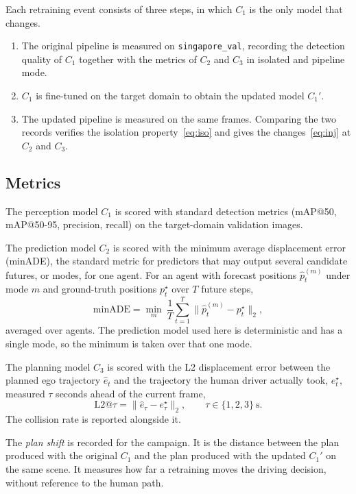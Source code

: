 \documentclass[conference]{IEEEtran}
\begin{document}
Each retraining event consists of three steps, in which $C_1$ is the only model
that changes.
\begin{enumerate}
\item The original pipeline is measured on \texttt{singapore\_val}, recording the
detection quality of $C_1$ together with the metrics of $C_2$ and $C_3$ in
isolated and pipeline mode.
\item $C_1$ is fine-tuned on the target domain to obtain the updated model
$C_1'$.
\item The updated pipeline is measured on the same frames. Comparing the two
records verifies the isolation property~\eqref{eq:iso} and gives the
changes~\eqref{eq:inj} at $C_2$ and $C_3$.
\end{enumerate}

\subsection{Metrics}
\label{sec:metrics}
The perception model $C_1$ is scored with standard detection metrics (mAP@50,
mAP@50-95, precision, recall) on the target-domain validation images.

The prediction model $C_2$ is scored with the minimum average displacement error
(minADE), the standard metric for predictors that may output several candidate
futures, or modes, for one agent. For an agent with forecast positions
$\hat{p}^{(m)}_{t}$ under mode $m$ and ground-truth positions $p^{\star}_{t}$
over $T$ future steps,
\begin{equation}
\mathrm{minADE} = \min_{m}\ \frac{1}{T}\sum_{t=1}^{T}
\bigl\lVert \hat{p}^{(m)}_{t} - p^{\star}_{t} \bigr\rVert_2 ,
\label{eq:minade}
\end{equation}
averaged over agents. The prediction model used here is deterministic and has a single
mode, so the minimum is taken over that one mode.

The planning model $C_3$ is scored with the L2 displacement error between the
planned ego trajectory $\hat{e}_t$ and the trajectory the human driver actually
took, $e^{\star}_t$, measured $\tau$ seconds ahead of the current frame,
\begin{equation}
\mathrm{L2}@\tau = \bigl\lVert \hat{e}_{\tau} - e^{\star}_{\tau} \bigr\rVert_2 ,
\qquad \tau \in \{1,2,3\}\ \text{s}.
\label{eq:l2}
\end{equation}
The collision rate is reported alongside it.

The \emph{plan shift} is recorded for the campaign. It is the distance between
the plan produced with the original $C_1$ and the plan produced with the updated
$C_1'$ on the same scene. It measures how far a retraining moves the driving
decision, without reference to the human path.
\end{document}
